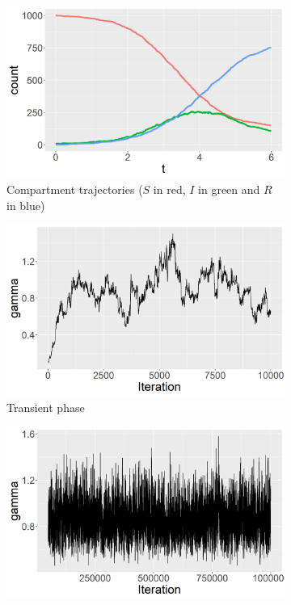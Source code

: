 \documentclass[11pt]{article}
\begin{document}
	\begin{figure}
		\centering
		\begin{subfigure}[b]{0.32\textwidth}
			\centering
			\includegraphics[width=\textwidth]{E1_trajectories}
			\caption{Compartment trajectories ($S$ in red, $I$ in green and $R$ in blue)}
			\label{fig:E1_trajectories}
		\end{subfigure}
		\hfill
		\begin{subfigure}[b]{0.32\textwidth}
			\centering
			\includegraphics[width=\textwidth]{E1_short_no_burn_gamma_tp}
			\caption{Transient phase}
			\label{fig:E1_short_no_burn_gamma_tp}
		\end{subfigure}
		\hfill
		\begin{subfigure}[b]{0.32\textwidth}
			\centering
			\includegraphics[width=\textwidth]{E1_burn_gamma_tp}

\end{subfigure}
\end{figure}
\end{document}
